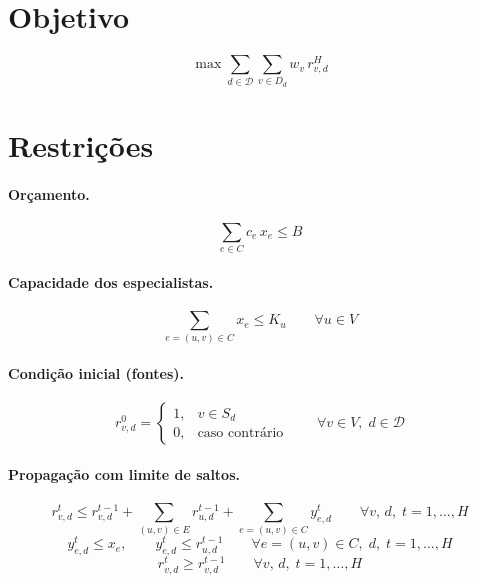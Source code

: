 \documentclass{article}
\begin{document}
\section*{Objetivo}
\[
    \max \sum_{d \in \mathcal{D}} \sum_{v \in D_d} w_v \, r_{v,d}^{H}
\]

\section*{Restrições}

\paragraph{Orçamento.}
\[
    \sum_{e \in C} c_e \, x_e \le B
\]

\paragraph{Capacidade dos especialistas.}
\[
    \sum_{e = (u,v) \in C} x_e \le K_u \qquad \forall u \in V
\]

\paragraph{Condição inicial (fontes).}
\[
    r_{v,d}^{0} = 
    \begin{cases}
        1, & v \in S_d \\
        0, & \text{caso contrário}
    \end{cases}
    \qquad \forall v \in V,\; d \in \mathcal{D}
\]

\paragraph{Propagação com limite de saltos.}
\[
    r_{v,d}^{t} \le r_{v,d}^{t-1} 
    + \sum_{(u,v) \in E} r_{u,d}^{t-1} 
    + \sum_{e=(u,v) \in C} y_{e,d}^{t}
    \qquad \forall v,\, d,\; t = 1,\dots,H
\]
\[
    y_{e,d}^{t} \le x_e, \qquad y_{e,d}^{t} \le r_{u,d}^{t-1}
    \qquad \forall e = (u,v) \in C,\; d,\; t = 1,\dots,H
\]
\[
    r_{v,d}^{t} \ge r_{v,d}^{t-1} \qquad \forall v,\, d,\; t = 1,\dots,H
\]
\end{document}
